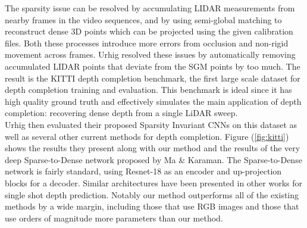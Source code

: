The sparsity issue can be resolved by accumulating LIDAR measurements from nearby frames in the video sequences, and by using semi-global matching to reconstruct dense 3D points which can be projected using the given calibration files. Both these processes introduce more errors from occlusion and non-rigid movement across frames. Urhig \etal resolved these issues by automatically removing accumulated LIDAR points that deviate from the SGM points by too much. The result is the KITTI depth completion benchmark, the first large scale dataset for depth completion training and evaluation. This benchmark is ideal since it has high quality ground truth and effectively simulates the main application of depth completion: recovering dense depth from a single LiDAR sweep.\\

Urhig \etal then evaluated their proposed Sparsity Invariant CNNs on this dataset as well as several other current methods for depth completion. Figure (\ref{fig:kitti}) shows the results they present along with our method and the results of the very deep Sparse-to-Dense network proposed by Ma \& Karaman. The Sparse-to-Dense network is fairly standard, using Resnet-18 as an encoder and up-projection blocks for a decoder. Similar architectures have been presented in other works for single shot depth prediction. Notably our method outperforms all of the existing methods by a wide margin, including those that use RGB images and those that use orders of magnitude more parameters than our method.
